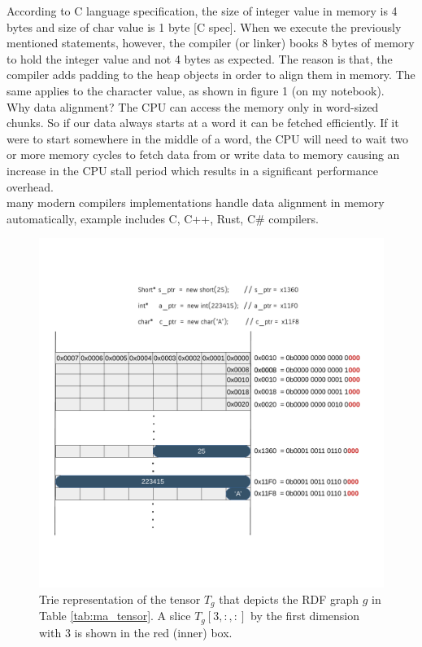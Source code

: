 According to C language specification, the size of integer value in memory is 4 bytes and size of char value is 1 byte [C spec]. When we execute the previously mentioned statements, however, the compiler (or linker) books 8 bytes of memory to hold the integer value and not 4 bytes as expected. The reason is that, the compiler adds padding to the heap objects in order to align them in memory. The same applies to the character value, as shown in figure 1 (on my notebook).  \\

Why data alignment? The CPU can access the memory only in word-sized chunks. So if our data always starts at a word it can be fetched efficiently. If it were to start somewhere in the middle of a word, the CPU will need to wait two or more memory cycles to fetch data from or write data to memory causing an increase in the CPU stall period which results in a significant performance overhead. \\


many modern compilers implementations handle data alignment in memory automatically, example includes C, C++, Rust, C\# compilers.

\begin{figure}
	\centering
	\includegraphics[scale=0.8]{figures/chapter2/memorylayout}
	\caption{Trie representation of the tensor $T_g$ that depicts the RDF graph $g$ in  Table \ref{tab:ma_tensor}. A slice $T_g[3, :, :]$ by the first dimension with 3 is shown in the red (inner) box.}
	\label{fig:data_aligntment}
\end{figure}

